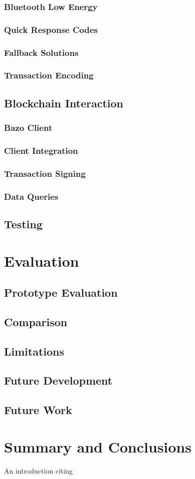 \documentclass[a4paper]{article}
\begin{document}
\subsubsection{Bluetooth Low Energy}
\subsubsection{Quick Response Codes}
\subsubsection{Fallback Solutions}
\subsubsection{Transaction Encoding}

\subsection{Blockchain Interaction}
\subsubsection{Bazo Client}
\subsubsection{Client Integration}
\subsubsection{Transaction Signing}
\subsubsection{Data Queries}

\subsection{Testing}
\newpage

\section{Evaluation}
\subsection{Prototype Evaluation}
\subsection{Comparison}
\subsection{Limitations}
\subsection{Future Development}
\subsection{Future Work}
\newpage

\section{Summary and Conclusions}
An introduction citing \cite{Liviosgier}

\newpage



\end{document}
